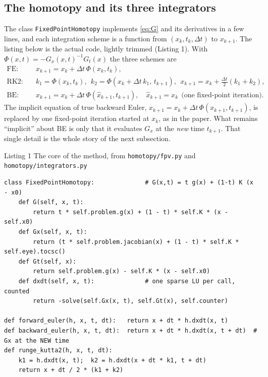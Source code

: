 \documentclass[11pt,a4paper]{article}
\newcommand{\code}[1]{\texttt{#1}}
\begin{document}
\subsection{The homotopy and its three integrators}
The class \code{FixedPointHomotopy} implements \eqref{eq:G} and its derivatives in a few lines, and each
integration scheme is a function from $(x_k,t_k,\Delta t)$ to $x_{k+1}$. The listing below is the actual
code, lightly trimmed (Listing 1). With $\Phi(x,t) = -G_x(x,t)^{-1}G_t(x)$ the three schemes are
\begin{align}
  \text{FE:}\quad & x_{k+1} = x_k + \Delta t\,\Phi(x_k,t_k), \label{eq:fe}\\
  \text{RK2:}\quad & k_1=\Phi(x_k,t_k),\ \ k_2=\Phi(x_k+\Delta t\,k_1,\,t_{k+1}),\ \ x_{k+1}=x_k+\tfrac{\Delta t}{2}(k_1+k_2), \label{eq:rk2}\\
  \text{BE:}\quad & x_{k+1} = x_k + \Delta t\,\Phi(\hat x_{k+1},t_{k+1}),\quad \hat x_{k+1}=x_k \ \ \text{(one fixed-point iteration)}. \label{eq:be}
\end{align}
The implicit equation of true backward Euler, $x_{k+1}=x_k+\Delta t\,\Phi(x_{k+1},t_{k+1})$, is replaced by
one fixed-point iteration started at $x_k$, as in the paper. What remains ``implicit'' about BE is only
that it evaluates $G_x$ at the \emph{new} time $t_{k+1}$. That single detail is the whole story of the
next subsection.

\begin{codebox}{Listing 1 \quad The core of the method, from \texttt{homotopy/fpv.py} and \texttt{homotopy/integrators.py}}
\begin{lstlisting}[style=py]
class FixedPointHomotopy:              # G(x,t) = t g(x) + (1-t) K (x - x0)
    def G(self, x, t):
        return t * self.problem.g(x) + (1 - t) * self.K * (x - self.x0)
    def Gx(self, x, t):
        return (t * self.problem.jacobian(x) + (1 - t) * self.K * self.eye).tocsc()
    def Gt(self, x):
        return self.problem.g(x) - self.K * (x - self.x0)
    def dxdt(self, x, t):              # one sparse LU per call, counted
        return -solve(self.Gx(x, t), self.Gt(x), self.counter)

def forward_euler(h, x, t, dt):   return x + dt * h.dxdt(x, t)
def backward_euler(h, x, t, dt):  return x + dt * h.dxdt(x, t + dt)  # Gx at the NEW time
def runge_kutta2(h, x, t, dt):
    k1 = h.dxdt(x, t);  k2 = h.dxdt(x + dt * k1, t + dt)
    return x + dt / 2 * (k1 + k2)
\end{lstlisting}
\end{codebox}
\end{document}
